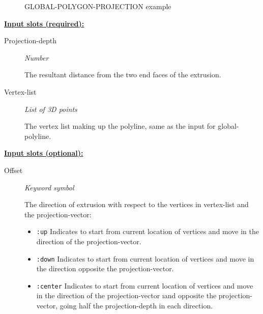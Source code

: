 \documentclass [11pt]{book}
\begin{document}
\begin{itemize}
\begin{figure}
\caption{GLOBAL-POLYGON-PROJECTION example}

\label{fig:GLOBAL-POLYGON-PROJECTION}

\end{figure}





\textbf{
\underline{Input slots (required):}}

\begin{description}

\item [Projection-depth]
\emph{Number}

 The resultant distance from the two end faces of the extrusion.




\item [Vertex-list]
\emph{List of 3D points}

 The vertex list making up the polyline, same as the input for global-polyline.




\end{description}






\textbf{
\underline{Input slots (optional):}}

\begin{description}

\item [Offset]
\emph{Keyword symbol}

 The direction of extrusion with respect to the vertices in vertex-list and the projection-vector:


\begin{itemize}

\item \texttt{:up} Indicates to start from current location of vertices and move in the direction of
the projection-vector.


\item \texttt{:down} Indicates to start from current location of vertices and move in the direction opposite
the projection-vector.


\item \texttt{:center} Indicates to start from current location of vertices and move in the direction of
the projection-vector 
\i{and} opposite the projection-vector, going half the projection-depth in
each direction.



\end{itemize}
\end{description}
\end{itemize}
\end{document}
